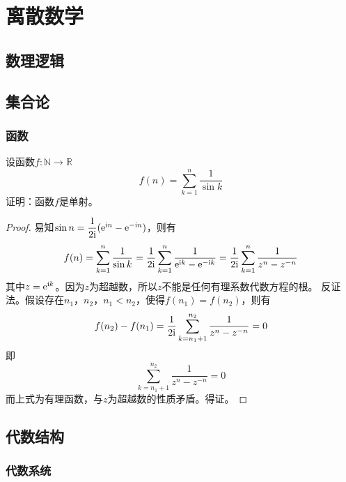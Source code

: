 \chapter{离散数学}

\section{数理逻辑}

\section{集合论}

\subsection{函数}

\begin{proposition}

    设函数$f : \mathbb{N} \to \mathbb{R}$
    $$f(n) = \sum\limits_{k = 1}^{n}{\dfrac{1}{\sin{k}}}$$
    证明：函数$f$是单射。

\end{proposition}

\begin{proof}

    易知$\sin{n} = \dfrac{1}{2\mathrm{i}}(\mathrm{e}^{\mathrm{i} n} - \mathrm{e}^{-\mathrm{i} n})$，则有
    $$f(n) = \sum\limits_{k = 1}^{n}{\dfrac{1}{\sin{k}}} = \dfrac{1}{2\mathrm{i}}\sum\limits_{k = 1}^{n}{\dfrac{1}{\mathrm{e}^{\mathrm{i} k} - \mathrm{e}^{-\mathrm{i} k}}} = \dfrac{1}{2\mathrm{i}}\sum\limits_{k = 1}^{n}{\dfrac{1}{z^n - z^{-n}}}$$
    其中$z = \mathrm{e}^{\mathrm{i} k}$。因为$z$为超越数，所以$z$不能是任何有理系数代数方程的根。
    反证法。假设存在$n_1$，$n_2$，$n_1 < n_2$，使得$f(n_1) = f(n_2)$，则有
    $$f(n_2) - f(n_1) = \dfrac{1}{2\mathrm{i}}\sum\limits_{k = n_1 + 1}^{n_2}{\dfrac{1}{z^n - z^{-n}}} = 0$$
    即
    $$\sum\limits_{k = n_1 + 1}^{n_2}{\dfrac{1}{z^n - z^{-n}}} = 0$$
    而上式为有理函数，与$z$为超越数的性质矛盾。得证。
    
\end{proof}

\section{代数结构}

\subsection{代数系统}

